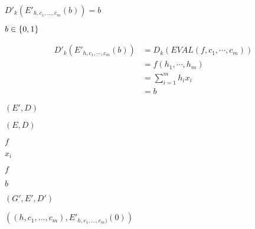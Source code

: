 \documentclass[10pt]{book}
\begin{document}
\begin{mdSnippets}
\begin{mdInlineSnippet}[e166698811af9206072297d09fb6b5d4]%
$D'_k(E'_{h,c_1,\ldots,c_m}(b))=b$\end{mdInlineSnippet}%
\begin{mdInlineSnippet}[6892f7e7c3b8ecc19e4a077e82515567]%
$b \in \{0,1\}$\end{mdInlineSnippet}%
\begin{mdDisplaySnippet}%
\[%
\begin{aligned}
  D'_k(E'_{h,c_1,\cdots,c_m}(b)) &= D_k(EVAL(f, c_1,\cdots,c_m)) \\
  &= f(h_1,\cdots,h_m) \\
  &= \sum_{i = 1}^m h_ix_i \\
  &= b
\end{aligned} 
\]%
\end{mdDisplaySnippet}%
\begin{mdInlineSnippet}[7058ead9ce830b45d9de24050e8f5198]%
$(E',D)$\end{mdInlineSnippet}%
\begin{mdInlineSnippet}[c150726dc018e82825c0c3617f46a1c9]%
$(E,D)$\end{mdInlineSnippet}%
\begin{mdInlineSnippet}%
$f$\end{mdInlineSnippet}%
\begin{mdInlineSnippet}%
$x_i$\end{mdInlineSnippet}%
\begin{mdInlineSnippet}%
$f$\end{mdInlineSnippet}%
\begin{mdInlineSnippet}%
$b$\end{mdInlineSnippet}%
\begin{mdInlineSnippet}[96822b145cbde12fe29d715f95c7849e]%
$(G',E',D')$\end{mdInlineSnippet}%
\begin{mdInlineSnippet}%
$((h,c_1,\ldots,c_m),E'_{h,c_1,\ldots,c_m)}(0))$\end{mdInlineSnippet}%

\end{mdSnippets}
\end{document}
